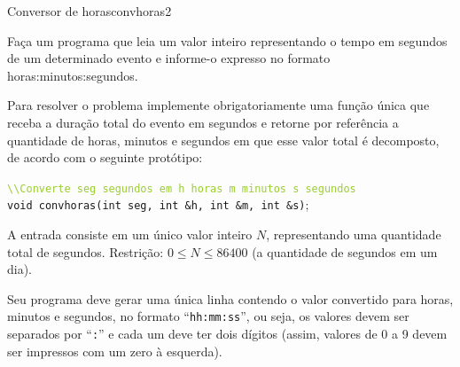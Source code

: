 \documentclass[12pt,a4paper,oneside]{article}
\begin{document}
\begin{problem}{Conversor de horas}{convhoras}{2}

Faça um programa que leia um valor inteiro representando o tempo em segundos de um determinado evento e informe-o expresso no formato horas:minutos:segundos.

Para resolver o problema implemente obrigatoriamente uma função única que receba a duração total do evento em segundos e retorne por referência a quantidade de horas,
minutos e segundos em que esse valor total é decomposto, de acordo com o seguinte protótipo:

\texttt{\textcolor{YellowGreen}{\textbackslash\textbackslash Converte seg segundos em h horas m minutos s segundos}}\\
\texttt{\textcolor{Mulberry}{void} convhoras(\textcolor{Mulberry}{int} seg, \textcolor{Mulberry}{int \&}h, \textcolor{Mulberry}{int \&}m, \textcolor{Mulberry}{int \&}s)};




%

\InputFile

A entrada consiste em um único valor inteiro $N$, representando uma quantidade total de segundos. Restrição: $0 \leq N \leq 86400$ (a quantidade de segundos em um dia).

\OutputFile

Seu programa deve gerar uma única linha contendo o valor convertido para horas, minutos e segundos, no formato ``\texttt{hh:mm:ss}'', ou seja, os valores devem ser separados por ``\texttt{:}'' e cada um deve ter dois dígitos (assim, valores de 0 a 9 devem ser impressos com um zero à esquerda).



\Example

\begin{example}
%
\end{example}

\begin{example}
%
\end{example}


\end{problem}
\end{document}
